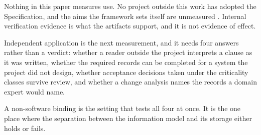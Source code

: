 Nothing in this paper measures use. No project outside this work has adopted the Specification, and the aims the framework sets itself are unmeasured \citep{goal2026}. Internal verification evidence is what the artifacts support, and it is not evidence of effect.

Independent application is the next measurement, and it needs four answers rather than a verdict: whether a reader outside the project interprets a clause as it was written, whether the required records can be completed for a system the project did not design, whether acceptance decisions taken under the criticality classes survive review, and whether a change analysis names the records a domain expert would name.

A non-software binding is the setting that tests all four at once. It is the one place where the separation between the information model and its storage either holds or fails.
